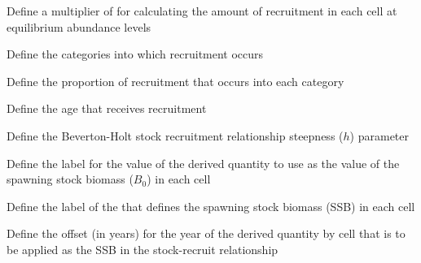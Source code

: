  {Define a multiplier of  for calculating the amount of recruitment in each cell at equilibrium abundance levels}

 {Define the categories into which recruitment occurs}

 {Define the proportion of recruitment that occurs into each category}

 {Define the age that receives recruitment}

 {Define the Beverton-Holt stock recruitment relationship steepness ($h$) parameter}



 {Define the  label for the value of the derived quantity  to use as the value of the spawning stock biomass ($B_0$) in each cell}

 {Define the label of the  that defines the spawning stock biomass (SSB) in each cell}

 {Define the offset (in years) for the year of the derived quantity by cell that is to be applied as the SSB in the stock-recruit relationship}

